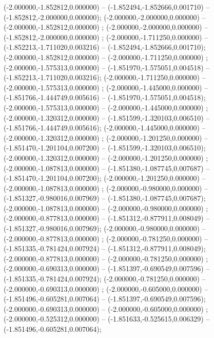  (-2.000000,-1.852812,0.000000) -- (-1.852494,-1.852666,0.001710) -- (-1.852812,-2.000000,0.000000);
 (-2.000000,-2.000000,0.000000) -- (-2.000000,-1.852812,0.000000) ;
 (-2.000000,-2.000000,0.000000) -- (-1.852812,-2.000000,0.000000) ;
 (-2.000000,-1.711250,0.000000) -- (-1.852213,-1.711020,0.003216) -- (-1.852494,-1.852666,0.001710);
 (-2.000000,-1.852812,0.000000) -- (-2.000000,-1.711250,0.000000) ;
 (-2.000000,-1.575313,0.000000) -- (-1.851970,-1.575051,0.004518) -- (-1.852213,-1.711020,0.003216);
 (-2.000000,-1.711250,0.000000) -- (-2.000000,-1.575313,0.000000) ;
 (-2.000000,-1.445000,0.000000) -- (-1.851766,-1.444749,0.005616) -- (-1.851970,-1.575051,0.004518);
 (-2.000000,-1.575313,0.000000) -- (-2.000000,-1.445000,0.000000) ;
 (-2.000000,-1.320312,0.000000) -- (-1.851599,-1.320103,0.006510) -- (-1.851766,-1.444749,0.005616);
 (-2.000000,-1.445000,0.000000) -- (-2.000000,-1.320312,0.000000) ;
 (-2.000000,-1.201250,0.000000) -- (-1.851470,-1.201104,0.007200) -- (-1.851599,-1.320103,0.006510);
 (-2.000000,-1.320312,0.000000) -- (-2.000000,-1.201250,0.000000) ;
 (-2.000000,-1.087813,0.000000) -- (-1.851380,-1.087745,0.007687) -- (-1.851470,-1.201104,0.007200);
 (-2.000000,-1.201250,0.000000) -- (-2.000000,-1.087813,0.000000) ;
 (-2.000000,-0.980000,0.000000) -- (-1.851327,-0.980016,0.007969) -- (-1.851380,-1.087745,0.007687);
 (-2.000000,-1.087813,0.000000) -- (-2.000000,-0.980000,0.000000) ;
 (-2.000000,-0.877813,0.000000) -- (-1.851312,-0.877911,0.008049) -- (-1.851327,-0.980016,0.007969);
 (-2.000000,-0.980000,0.000000) -- (-2.000000,-0.877813,0.000000) ;
 (-2.000000,-0.781250,0.000000) -- (-1.851335,-0.781424,0.007924) -- (-1.851312,-0.877911,0.008049);
 (-2.000000,-0.877813,0.000000) -- (-2.000000,-0.781250,0.000000) ;
 (-2.000000,-0.690313,0.000000) -- (-1.851397,-0.690549,0.007596) -- (-1.851335,-0.781424,0.007924);
 (-2.000000,-0.781250,0.000000) -- (-2.000000,-0.690313,0.000000) ;
 (-2.000000,-0.605000,0.000000) -- (-1.851496,-0.605281,0.007064) -- (-1.851397,-0.690549,0.007596);
 (-2.000000,-0.690313,0.000000) -- (-2.000000,-0.605000,0.000000) ;
 (-2.000000,-0.525312,0.000000) -- (-1.851633,-0.525615,0.006329) -- (-1.851496,-0.605281,0.007064);

